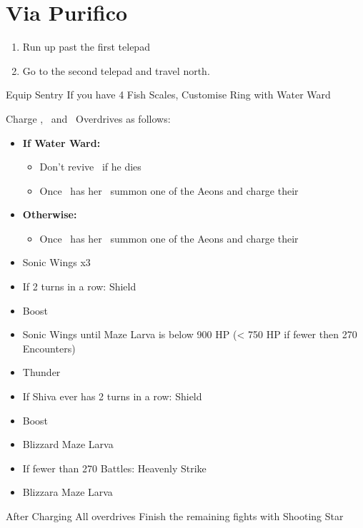\chapter{Via Purifico}
\begin{enumerate}
	\item Run up past the first telepad
	\item Go to the second telepad and travel north.
\end{enumerate}
\begin{equip}
	\begin{itemize}
		\auronf Equip Sentry
		\yunaf If you have 4 Fish Scales, Customise Ring with Water Ward
	\end{itemize}
\end{equip}
\begin{encounters}
	Charge \yuna , \valefor\ and \shiva\ Overdrives as follows:
	\vspace{\baselineskip}
	\begin{itemize}
		\yunaf
		\begin{itemize}
			\item \textbf{If Water Ward:}
				\begin{itemize}
					\yunaf Hi-Potion Self if damaged, otherwise defend
					\auronf Defend Always
					\item Don't revive \auron\ if he dies
					\item Once \yuna\ has her \od\ summon one of the Aeons and charge their \od\
				\end{itemize}
			\item \textbf{Otherwise:}
				\begin{itemize}
					\yunaf Defend
					\auronf Phoenix Down \yuna, or Hi-Potion Self
					\item Once \yuna\ has her \od\ summon one of the Aeons and charge their \od\
				\end{itemize}
		\end{itemize}
		\valeforf
		\begin{itemize}
			\item Sonic Wings x3
			\item If 2 turns in a row: Shield
			\item Boost
			\item Sonic Wings until Maze Larva is below 900 HP (< 750 HP if fewer then 270 Encounters)
			\item Thunder
		\end{itemize}
		\shivaf
		\begin{itemize}
			\item If Shiva ever has 2 turns in a row: Shield
			\item Boost
			\item Blizzard Maze Larva
			\item If fewer than 270 Battles: Heavenly Strike
			\item Blizzara Maze Larva
		\end{itemize}
	\end{itemize}
	\vspace{\baselineskip}
	After Charging All overdrives Finish the remaining fights with Shooting Star
\end{encounters}
